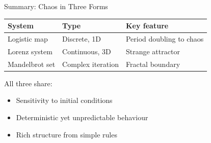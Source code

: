 \begin{frame}{Summary: Chaos in Three Forms}
  \begin{center}
    \begin{tabular}{lll}
      \textbf{System} & \textbf{Type} & \textbf{Key feature} \\
      \hline
      Logistic map & Discrete, 1D & Period doubling to chaos \\
      Lorenz system & Continuous, 3D & Strange attractor \\
      Mandelbrot set & Complex iteration & Fractal boundary \\
    \end{tabular}
  \end{center}

  \vfill
  All three share:
  \begin{itemize}
    \item Sensitivity to initial conditions
    \item Deterministic yet unpredictable behaviour
    \item Rich structure from simple rules
  \end{itemize}
\end{frame}
